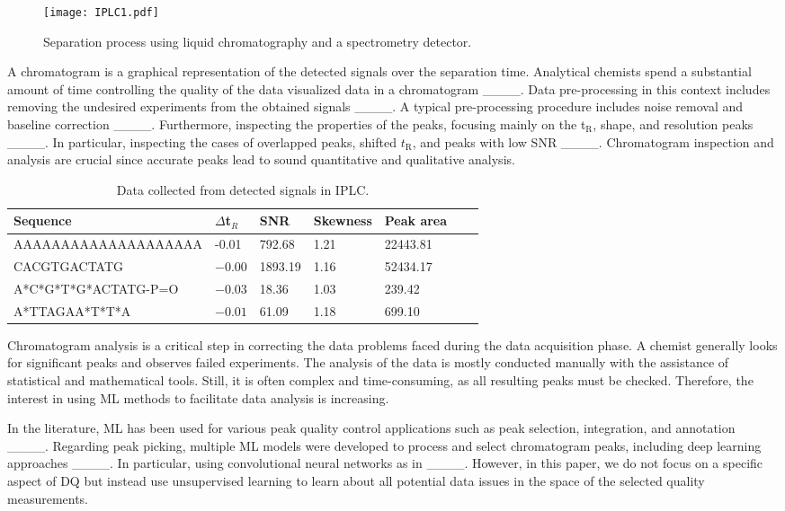 \begin{figure}
  \centering
    \texttt{[image: IPLC1.pdf]}
    \caption{Separation process using liquid chromatography and a spectrometry detector. }\label{fig:IPLC}
\end{figure}

A chromatogram is a graphical representation of the detected signals over the separation time. Analytical chemists spend a substantial amount of time controlling the quality of the data visualized data in a chromatogram ____. Data pre-processing in this context includes removing the undesired experiments from the obtained signals ____. A typical pre-processing procedure includes noise removal and baseline correction ____. Furthermore, inspecting the properties of the peaks, focusing mainly on the t$_\mathrm{R}$, shape, and resolution peaks ____. In particular, inspecting the cases of overlapped peaks, shifted $t_\mathrm{R}$, and peaks with low SNR ____. Chromatogram inspection and analysis are crucial since accurate peaks lead to sound quantitative and qualitative analysis. 

\begin{table}
\setlength{\tabcolsep}{5 pt}
\centering
\caption{Data collected from detected signals in IPLC.}
\label{tab:signalsdata}
\begin{tabular}{lllllll}
\toprule
\textbf{Sequence}& \textbf{$\Delta$t$_R$} & \textbf{SNR} & \textbf{Skewness} & \textbf{Peak area}\\
\midrule
AAAAAAAAAAAAAAAAAAAA & -0.01 & 792.68 & 1.21 & 22443.81\\
CACGTGACTATG& $-0.00$ & 1893.19&	1.16& 52434.17 \\
A*C*G*T*G*ACTATG-P=O & $-0.03$&	18.36&	1.03&	239.42\\
A*TTAGAA*T*T*A & $-0.01$ &	61.09 &	1.18 & 699.10\\
\bottomrule
\end{tabular}
\end{table}

Chromatogram analysis is a critical step in correcting the data problems faced during the data acquisition phase. A chemist generally looks for significant peaks and observes failed experiments. The analysis of the data is mostly conducted manually with the assistance of statistical and mathematical tools. Still, it is often complex and time-consuming, as all resulting peaks must be checked. Therefore, the interest in using ML methods to facilitate data analysis is increasing.

In the literature, ML has been used for various peak quality control applications such as peak selection, integration, and annotation ____. Regarding peak picking, multiple ML models were developed to process and select chromatogram peaks, including deep learning approaches ____. In particular, using convolutional neural networks as in ____. However, in this paper, we do not focus on a specific aspect of DQ but instead use unsupervised learning to learn about all potential data issues in the space of the selected quality measurements. 

